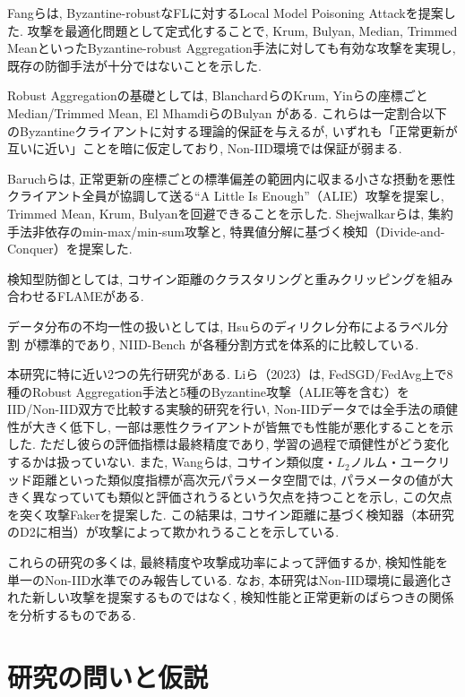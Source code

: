 \documentclass[a4j, dvipdfmx]{jsarticle}
\begin{document}
Fangらは, Byzantine-robustなFLに対するLocal Model Poisoning Attackを提案した. 攻撃を最適化問題として定式化することで, Krum, Bulyan, Median, Trimmed MeanといったByzantine-robust Aggregation手法に対しても有効な攻撃を実現し, 既存の防御手法が十分ではないことを示した\cite{fang2020local}.

Robust Aggregationの基礎としては, BlanchardらのKrum\cite{blanchard2017krum}, Yinらの座標ごとMedian/Trimmed Mean\cite{yin2018byzantine}, El MhamdiらのBulyan\cite{elmhamdi2018hidden} がある. これらは一定割合以下のByzantineクライアントに対する理論的保証を与えるが, いずれも「正常更新が互いに近い」ことを暗に仮定しており, Non-IID環境では保証が弱まる.

Baruchらは, 正常更新の座標ごとの標準偏差の範囲内に収まる小さな摂動を悪性クライアント全員が協調して送る``A Little Is Enough''（ALIE）攻撃を提案し, Trimmed Mean, Krum, Bulyanを回避できることを示した\cite{baruch2019little}. Shejwalkarらは, 集約手法非依存のmin-max/min-sum攻撃と, 特異値分解に基づく検知（Divide-and-Conquer）を提案した\cite{shejwalkar2021manipulating}.

検知型防御としては, コサイン距離のクラスタリングと重みクリッピングを組み合わせるFLAME\cite{nguyen2022flame}がある.

データ分布の不均一性の扱いとしては, Hsuらのディリクレ分布によるラベル分割\cite{hsu2019measuring} が標準的であり, NIID-Bench\cite{li2022federated} が各種分割方式を体系的に比較している.

本研究に特に近い2つの先行研究がある. Liら（2023）は, FedSGD/FedAvg上で8種のRobust Aggregation手法と5種のByzantine攻撃（ALIE等を含む）をIID/Non-IID双方で比較する実験的研究を行い, Non-IIDデータでは全手法の頑健性が大きく低下し, 一部は悪性クライアントが皆無でも性能が悪化することを示した\cite{li2023experimental}. ただし彼らの評価指標は最終精度であり, 学習の過程で頑健性がどう変化するかは扱っていない. また, Wangらは, コサイン類似度・$L_2$ノルム・ユークリッド距離といった類似度指標が高次元パラメータ空間では, パラメータの値が大きく異なっていても類似と評価されうるという欠点を持つことを示し, この欠点を突く攻撃Fakerを提案した\cite{wang2023trust}. この結果は, コサイン距離に基づく検知器（本研究のD2に相当）が攻撃によって欺かれうることを示している.

これらの研究の多くは, 最終精度や攻撃成功率によって評価するか, 検知性能を単一のNon-IID水準でのみ報告している. なお, 本研究はNon-IID環境に最適化された新しい攻撃を提案するものではなく, 検知性能と正常更新のばらつきの関係を分析するものである.

\section{研究の問いと仮説}
\label{sec:rq}
\end{document}
